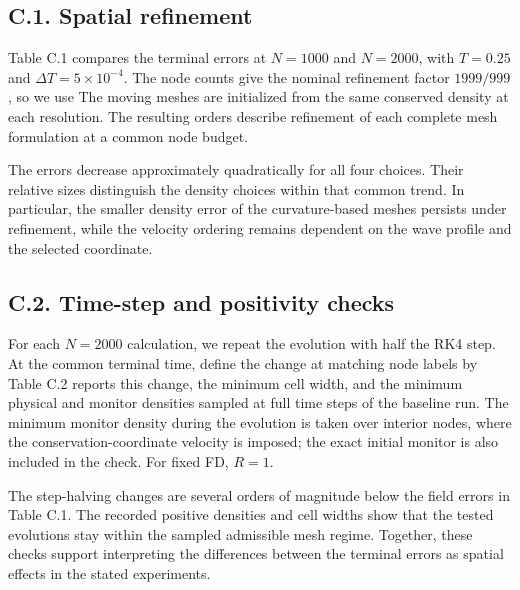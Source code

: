 \subsection*{C.1. Spatial refinement}

Table C.1 compares the terminal errors at \(N=1000\) and \(N=2000\), with \(T=0.25\) and \(\Delta T=5\times10^{-4}\). The node counts give the nominal refinement factor \(1999/999\), so we use
The moving meshes are initialized from the same conserved density at each resolution. The resulting orders describe refinement of each complete mesh formulation at a common node budget.


The errors decrease approximately quadratically for all four choices. Their relative sizes distinguish the density choices within that common trend. In particular, the smaller density error of the curvature-based meshes persists under refinement, while the velocity ordering remains dependent on the wave profile and the selected coordinate.

\subsection*{C.2. Time-step and positivity checks}

For each \(N=2000\) calculation, we repeat the evolution with half the RK4 step. At the common terminal time, define the change at matching node labels by
Table C.2 reports this change, the minimum cell width, and the minimum physical and monitor densities sampled at full time steps of the baseline run. The minimum monitor density during the evolution is taken over interior nodes, where the conservation-coordinate velocity is imposed; the exact initial monitor is also included in the check. For fixed FD, \(R=1\).


The step-halving changes are several orders of magnitude below the field errors in Table C.1. The recorded positive densities and cell widths show that the tested evolutions stay within the sampled admissible mesh regime. Together, these checks support interpreting the differences between the terminal errors as spatial effects in the stated experiments.


